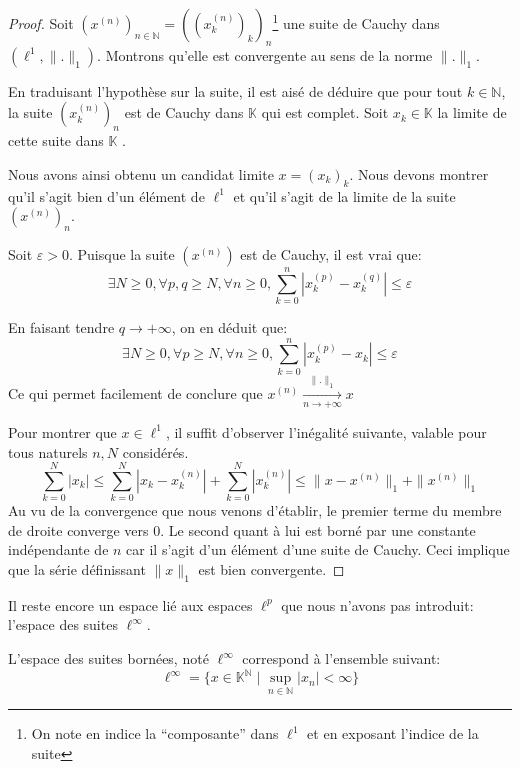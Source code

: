 \begin{proof}
  Soit $\left(x^{(n)}\right)_{n\in\mathbb{N}}=
  \left(\left(x_k^{(n)}\right)_k\right)_n$\footnote{
    On note en indice la ``composante'' dans $\ell^1$ et en
    exposant l'indice de la suite} une suite de
  Cauchy dans $(\ell^1, \|.\|_1)$. Montrons qu'elle est convergente
  au sens de la norme $\|.\|_1$.

  En traduisant l'hypothèse sur la suite, il est aisé de déduire que
  pour tout $k\in\mathbb{N}$, la suite $(x_k^{(n)})_n$ est de Cauchy dans
  $\mathbb{K}$ qui est complet. Soit $x_k\in\mathbb{K}$ la limite
  de cette suite dans $\mathbb{K}$ .

  Nous avons ainsi obtenu un candidat limite $x=(x_k)_k$. Nous devons
  montrer qu'il s'agit bien d'un élément de $\ell^1$ et qu'il s'agit de
  la limite de la suite $(x^{(n)})_n$.

  Soit $\varepsilon>0$. Puisque la suite $(x^{(n)})$ est de
  Cauchy, il est vrai que:
  $$ \exists  N\geq 0, \forall  p, q\geq N, \forall  n\geq 0,
  \sum_{k=0}^n| x^{(p)}_k - x^{(q)}_k|\leq\varepsilon$$

  En faisant tendre $q\to+\infty$, on en déduit que:
  $$ \exists  N\geq 0, \forall  p\geq N, \forall  n\geq 0,
  \sum_{k=0}^n| x^{(p)}_k - x_k|\leq\varepsilon$$
  Ce qui permet facilement de conclure que
  $x^{(n)}\xrightarrow[n\to+\infty]{\|.\|_1}x$

  Pour montrer que $x\in\ell^1$, il suffit d'observer l'inégalité
  suivante, valable pour tous naturels $n, N$ considérés.
  $$\sum_{k=0}^N|x_k|
  \leq \sum_{k=0}^N|x_k-x_k^ {(n)}|+ \sum_{k=0}^N|x_k^{(n)}|
  \leq \|x-x^{(n)}\|_1+\|x^{(n)}\|_1$$
  Au vu de la convergence que nous venons d'établir, le premier terme
  du membre de droite converge vers $0$. Le second quant à lui est
  borné par une constante indépendante de $n$ car il s'agit d'un
  élément d'une suite de Cauchy. Ceci implique que la série
  définissant $\|x\|_1$ est bien convergente.

\end{proof}

Il reste encore un espace lié aux espaces $\ell^p$ que
nous n'avons pas introduit: l'espace des suites $\ell^\infty$.

\begin{df}
  L'espace des suites bornées, noté $\ell^\infty$
  correspond à l'ensemble suivant:
  $$\ell^\infty=\{x\in\mathbb{K}^{\mathbb{N}}\mid
  \sup_{n\in\mathbb{N}}|x_n|<\infty\}$$
\end{df}

